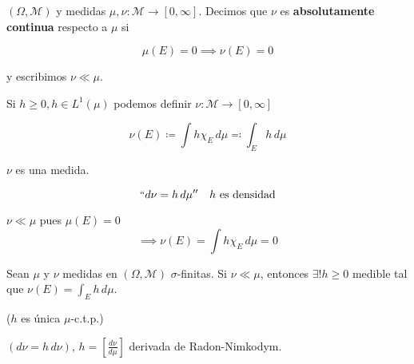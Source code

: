 \begin{fdefinition}
    $(\Omega,\mathcal{M})$ y medidas $\mu,\nu:\mathcal{M}\to[0,\infty]$. Decimos que $\nu$ es \textbf{absolutamente continua} respecto a $\mu$ si

    \[\mu(E)=0\implies \nu(E)=0\]

    y escribimos $\nu\ll\mu$.
\end{fdefinition}

\begin{fexample}
    Si $h\geq 0,h\in L^1(\mu)$ podemos definir $\nu:\mathcal{M}\to[0,\infty]$

    \[\nu(E)\coloneqq \int h\chi_E\,d\mu\eqqcolon \int_E h\,d\mu\]

    $\nu$ es una medida.

    \[``d\nu=h\,d\mu''\quad\text{$h$ es densidad}\]

    $\nu \ll \mu$ pues $\mu(E)=0$
    \[\implies \nu(E)=\int h\chi_E\,d\mu=0\]
\end{fexample}

\begin{ftheorem}
    Sean $\mu$ y $\nu$ medidas en $(\Omega,\mathcal{M})$ $\sigma$-finitas. Si $\nu\ll\mu$, entonces $\exists!h\geq 0$ medible tal que $\nu(E)=\displaystyle\int_E h\,d\mu$. 

    ($h$ es única $\mu$-c.t.p.)
\end{ftheorem}

$(d\nu=h\,d\nu)$, $h=[\frac{d\nu}{d\mu}]$ derivada de Radon-Nimkodym.

